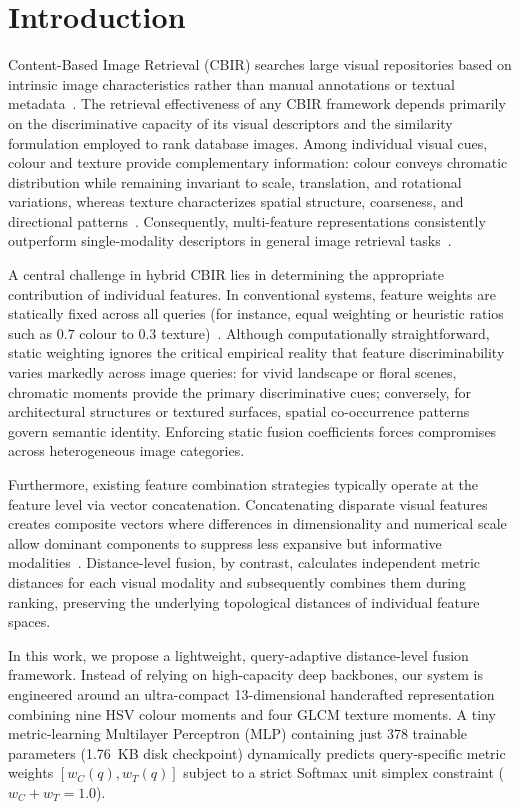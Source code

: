 \documentclass[pdflatex,sn-mathphys-num]{sn-jnl}
\begin{document}
\section{Introduction}\label{sec1}
Content-Based Image Retrieval (CBIR) searches large visual repositories based on intrinsic image characteristics rather than manual annotations or textual metadata~\cite{dubey2020survey}. The retrieval effectiveness of any CBIR framework depends primarily on the discriminative capacity of its visual descriptors and the similarity formulation employed to rank database images. Among individual visual cues, colour and texture provide complementary information: colour conveys chromatic distribution while remaining invariant to scale, translation, and rotational variations, whereas texture characterizes spatial structure, coarseness, and directional patterns~\cite{chun2008cbir,stricker1995similarity}. Consequently, multi-feature representations consistently outperform single-modality descriptors in general image retrieval tasks~\cite{singh2018color,yue2011cbir}.

A central challenge in hybrid CBIR lies in determining the appropriate contribution of individual features. In conventional systems, feature weights are statically fixed across all queries (for instance, equal weighting or heuristic ratios such as $0.7$ colour to $0.3$ texture)~\cite{wang2014content}. Although computationally straightforward, static weighting ignores the critical empirical reality that feature discriminability varies markedly across image queries: for vivid landscape or floral scenes, chromatic moments provide the primary discriminative cues; conversely, for architectural structures or textured surfaces, spatial co-occurrence patterns govern semantic identity. Enforcing static fusion coefficients forces compromises across heterogeneous image categories.

Furthermore, existing feature combination strategies typically operate at the feature level via vector concatenation. Concatenating disparate visual features creates composite vectors where differences in dimensionality and numerical scale allow dominant components to suppress less expansive but informative modalities~\cite{akmal2023automatic}. Distance-level fusion, by contrast, calculates independent metric distances for each visual modality and subsequently combines them during ranking, preserving the underlying topological distances of individual feature spaces.

In this work, we propose a lightweight, query-adaptive distance-level fusion framework. Instead of relying on high-capacity deep backbones, our system is engineered around an ultra-compact 13-dimensional handcrafted representation combining nine HSV colour moments and four GLCM texture moments. A tiny metric-learning Multilayer Perceptron (MLP) containing just 378 trainable parameters (1.76~KB disk checkpoint) dynamically predicts query-specific metric weights $[w_C(q), w_T(q)]$ subject to a strict Softmax unit simplex constraint ($w_C + w_T = 1.0$).
\end{document}

